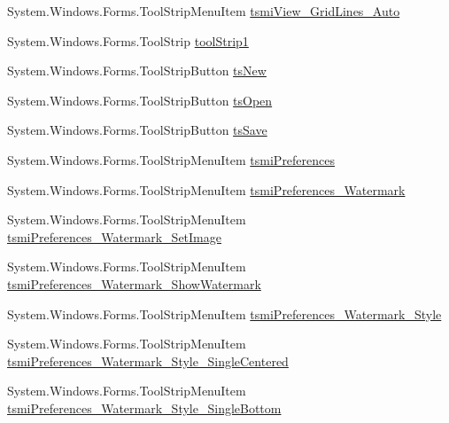 \begin{DoxyCompactItemize}
System.\+Windows.\+Forms.\+Tool\+Strip\+Menu\+Item \mbox{\hyperlink{class_paint___program_1_1_form1_a332948ae19923599f4bb4f63e9ad2622}{tsmi\+View\+\_\+\+Grid\+Lines\+\_\+\+Auto}}
\item 
System.\+Windows.\+Forms.\+Tool\+Strip \mbox{\hyperlink{class_paint___program_1_1_form1_ae6f0c67e634003110632daf5d4ce4ca0}{tool\+Strip1}}
\item 
System.\+Windows.\+Forms.\+Tool\+Strip\+Button \mbox{\hyperlink{class_paint___program_1_1_form1_afcd559bbcff109cecb42090b2650cb2e}{ts\+New}}
\item 
System.\+Windows.\+Forms.\+Tool\+Strip\+Button \mbox{\hyperlink{class_paint___program_1_1_form1_a605dc1d6022ba8f753b7f4f3f5d3b4cd}{ts\+Open}}
\item 
System.\+Windows.\+Forms.\+Tool\+Strip\+Button \mbox{\hyperlink{class_paint___program_1_1_form1_a4624b2b2d1e12703beaf5eb4c0d9ed43}{ts\+Save}}
\item 
System.\+Windows.\+Forms.\+Tool\+Strip\+Menu\+Item \mbox{\hyperlink{class_paint___program_1_1_form1_a586c8a81606850beb67c999f30ac9f90}{tsmi\+Preferences}}
\item 
System.\+Windows.\+Forms.\+Tool\+Strip\+Menu\+Item \mbox{\hyperlink{class_paint___program_1_1_form1_a03fc2ed80357faccd1c45c3e4b76f526}{tsmi\+Preferences\+\_\+\+Watermark}}
\item 
System.\+Windows.\+Forms.\+Tool\+Strip\+Menu\+Item \mbox{\hyperlink{class_paint___program_1_1_form1_a4cc9ee2a0b0292b4827be1ae0d890f17}{tsmi\+Preferences\+\_\+\+Watermark\+\_\+\+Set\+Image}}
\item 
System.\+Windows.\+Forms.\+Tool\+Strip\+Menu\+Item \mbox{\hyperlink{class_paint___program_1_1_form1_a0e5003a026b8805679f36cd92f6c4c4b}{tsmi\+Preferences\+\_\+\+Watermark\+\_\+\+Show\+Watermark}}
\item 
System.\+Windows.\+Forms.\+Tool\+Strip\+Menu\+Item \mbox{\hyperlink{class_paint___program_1_1_form1_adcbda1f8a1878dc025b9c2b7dbda2980}{tsmi\+Preferences\+\_\+\+Watermark\+\_\+\+Style}}
\item 
System.\+Windows.\+Forms.\+Tool\+Strip\+Menu\+Item \mbox{\hyperlink{class_paint___program_1_1_form1_acac1a40f079c81da99d288b7f0eb6a3d}{tsmi\+Preferences\+\_\+\+Watermark\+\_\+\+Style\+\_\+\+Single\+Centered}}
\item 
System.\+Windows.\+Forms.\+Tool\+Strip\+Menu\+Item \mbox{\hyperlink{class_paint___program_1_1_form1_a2394739603a64270002488ceba5670b8}{tsmi\+Preferences\+\_\+\+Watermark\+\_\+\+Style\+\_\+\+Single\+Bottom}}
\item 

\end{DoxyCompactItemize}
